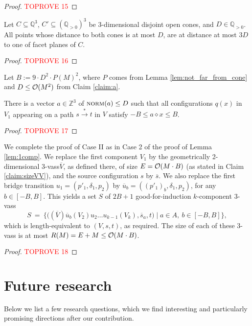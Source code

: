 \documentclass[a4paper, UKenglish, cleveref, autoref, thm-restate]{lipics-v2021}
\newcommand{\Z}{\mathbb{Z}}
\newcommand{\Q}{\mathbb{Q}}
\newcommand{\Qpos}{\Q_{>0}}
\newcommand{\set}[1]{\{#1\}}
\newcommand{\setof}[2]{\set{#1 \mid #2}}
\newcommand{\trans}[1]{\stackrel{#1}{\longrightarrow}}
\newcommand{\tran}{\trans{*}}
\newcommand{\norm}{\textsc{norm}}
\newcommand{\OO}{{\cal O}}
\newcommand{\vass}{{\sc vass}\xspace}
\newcommand{\tvass}{\parvass 3}
\newcommand{\geomvass}{geometrically 2-dimensional \tvass}
\newcommand{\parvass}[1]{{$#1$-\vass}\xspace}
\newcommand{\ktvassmodmod}{(\essdvass V) \essdvass u_{b} (V_2) u_2 \ldots u_{k-1} (V_k)}
\newcommand{\setfromto}[2]{[#1, #2]}
\newcommand{\essdvass}[1]{\overline{#1}}
\newcommand{\innprod}[2]{#1 \diamond #2} \newcommand{\pair}[2]{#1_{#2}}
\begin{document}
\begin{appendixproof}
\begin{proof}\textcolor{red}{TOPROVE 15}\end{proof}
\begin{claim} \label{claim:onefacet}
Let $C\subseteq \Q^3$, $C'\subseteq (\Qpos)^3$ be 3-dimensional disjoint open cones, and $D\in\Qpos$. 
All points whose distance to both cones is at most $D$,
are at distance at most $3D$ to one of facet planes of $C$.
\end{claim}
\begin{proof}\textcolor{red}{TOPROVE 16}\end{proof}
Let $B:=9\cdot D^2 \cdot P(M)^2$, where $P$ comes from Lemma \ref{lem:not_far_from_cone} and
$D\leq \OO(M^2)$ from Claim \ref{claim:a}.
\begin{claim} \label{claim:axgen}
There is a vector $a\in\Z^3$ of $\norm(a)\leq D$ such that
all configurations $q(x)$ in $V_1$ appearing on a path $s\tran t$ in $V$ satisfy
$-B \leq \innprod a x \leq B$.
\end{claim}
\begin{proof}\textcolor{red}{TOPROVE 17}\end{proof}
We complete the proof of Case II as in Case 2 of the proof of Lemma \ref{lem:1comp}.
We replace the first component $V_1$ by the \geomvass $\essdvass V$, as defined there,
of size $E = \OO(M\cdot B)$ (as stated in Claim \ref{claim:sizeVV}),
and the source configuration $s$ by $\essdvass s$.
We also replace the first bridge transition $u_1 = (p'_1, \delta_1, p_2)$ by
$\essdvass u_{b} = (\pair{(p'_1)} b, \delta_1, p_2)$, for any $b\in\setfromto{-B} B$.
This yields a set $S$ of $2B+1$ good-for-induction $k$-component \tvass
\[
S \ = \ \setof{\big(\ktvassmodmod, \essdvass s_a, t \big)}{a\in A, \ b\in \setfromto {-B} B},
\]
which is length-equivalent to $(V, s, t)$, as required. 
The size of each of these \tvass is at most $R(M) = E+M \leq \OO(M \cdot B)$.
\end{appendixproof}



\begin{proof}\textcolor{red}{TOPROVE 18}\end{proof}
 

\section{Future research}\label{sec:future}
Below we list a few research questions, which we find interesting and
particularly promising directions after our contribution.
\end{document}
